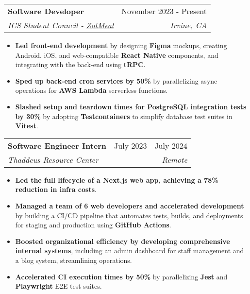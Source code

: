 \documentclass[letterpaper,11pt]{article}
\makeatletter
\newcommand{\resumeItem}[1]{
  \item\setstretch{.95}\small{
    {#1 \vspace{-2pt}}
  }
}
\newcommand{\resumeSubheading}[4]{
  \vspace{-2pt}\item
    \begin{tabular*}{0.97\textwidth}[t]{l@{\extracolsep{\fill}}r}
      \textbf{#1} & #2 \\
      \textit{\small#3} & \textit{\small #4} \\
    \end{tabular*}\vspace{-4.8pt}
}
\newcommand{\resumeItemListStart}{\begin{itemize}}
\newcommand{\resumeItemListEnd}{\end{itemize}\vspace{-5pt}}
\makeatother
\begin{document}
  \resumeSubheading
  {Software Developer}{November 2023 - Present}
  {ICS Student Council - \href{https://github.com/icssc/ZotMeal}{ZotMeal}}{Irvine, CA}
  \resumeItemListStart
    \resumeItem{\textbf{Led front-end development} by designing \textbf{Figma} mockups, creating Android, iOS, and web-compatible \textbf{React Native} components, and integrating with the back-end using \textbf{tRPC}.}
    \resumeItem{\textbf{Sped up back-end cron services by 50\%} by parallelizing async operations for \textbf{AWS Lambda} serverless functions.}
    \resumeItem{\textbf{Slashed setup and teardown times for PostgreSQL integration tests by 30\%} by adopting \textbf{Testcontainers} to simplify database test suites in \textbf{Vitest}.}
  \resumeItemListEnd

  \resumeSubheading
    {Software Engineer Intern}{July 2023 - July 2024}
    {Thaddeus Resource Center}{Remote}
    \resumeItemListStart
      \resumeItem{\textbf{Led the full lifecycle of a Next.js web app, achieving a 78\% reduction in infra costs}.}
      \resumeItem{\textbf{Managed a team of 6 web developers and accelerated development} by building a CI/CD pipeline that automates tests, builds, and deployments for staging and production using \textbf{GitHub Actions}.}
      \resumeItem{\textbf{Boosted organizational efficiency by developing comprehensive internal systems}, including an admin dashboard for staff management and a blog system, streamlining operations.}
      \resumeItem{\textbf{Accelerated CI execution times by 50\%} by parallelizing \textbf{Jest} and \textbf{Playwright} E2E test suites.}
    \resumeItemListEnd
\end{document}
